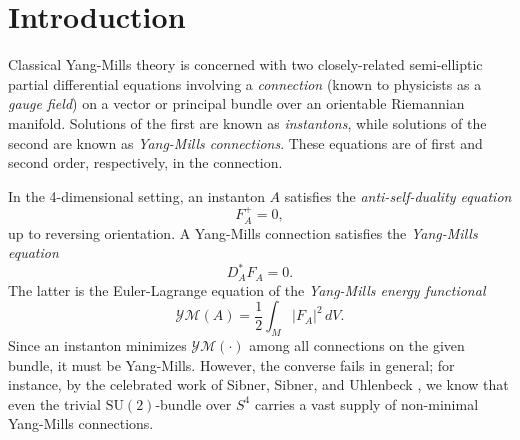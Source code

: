 \documentclass[12pt]{amsart}
\newcommand{\YM}{\mathcal{YM}}
\renewcommand{\1}{{\mathbf 1}}
\newcommand{\SU}{{\mathrm{SU} }}
\theoremstyle{others}
\numberwithin{equation}{section}
\begin{document}
\tableofcontents


\thispagestyle{empty}


\section{Introduction}


Classical Yang-Mills theory is concerned with two closely-related %
semi-elliptic partial differential equations involving a \emph{connection} (known to physicists as a \emph{gauge field}) on a vector or principal bundle over an orientable Riemannian manifold. Solutions of the first are known as \emph{instantons}, while solutions of the second are known as \emph{Yang-Mills connections}. These equations are of first and second order, respectively, in the connection. %

In the 4-dimensional setting, an instanton $A$ satisfies the %
\emph{anti-self-duality equation}
$$F_A^+ = 0,$$
up to reversing orientation.
A Yang-Mills connection satisfies the \emph{Yang-Mills equation} %
$$D_A^*F_A = 0.$$
The latter is the Euler-Lagrange equation of the \emph{Yang-Mills energy functional}
$$\YM(A) = \frac12 \int_M |F_A|^2\, dV.$$
Since an instanton minimizes $\YM(\cdot)$ among all connections on the given bundle, it must be Yang-Mills.
However, %
the converse fails in general; for instance,
by the celebrated work of Sibner, Sibner, and Uhlenbeck
\cite{sibnersuhlenbeck}, we know that even the trivial $\SU(2)$-bundle over $S^4$ carries a vast supply of non-minimal Yang-Mills connections. 
\end{document}
